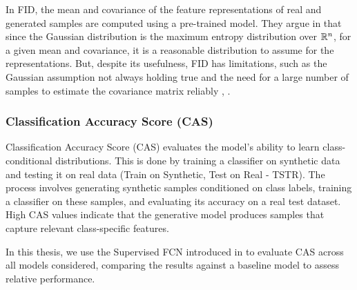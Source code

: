 \documentclass[../../thesis.tex]{subfiles}
\begin{document}
In FID, the mean and covariance of the feature representations of real and generated samples are computed using a pre-trained model. They argue in \cite{heusel2018gans} that since the Gaussian distribution is the maximum entropy distribution over $\mathbb{R}^n$, for a given mean and covariance, it is a reasonable distribution to assume for the representations. But, despite its usefulness, FID has limitations, such as the Gaussian assumption not always holding true and the need for a large number of samples to estimate the covariance matrix reliably \cite{jayasumana2024rethinking}, \cite{chong2020effectively}.

\subsubsection{Classification Accuracy Score (CAS)}
Classification Accuracy Score (CAS) evaluates the model's ability to learn class-conditional distributions. This is done by training a classifier on synthetic data and testing it on real data (Train on Synthetic, Test on Real - TSTR). The process involves generating synthetic samples conditioned on class labels, training a classifier on these samples, and evaluating its accuracy on a real test dataset. High CAS values indicate that the generative model produces samples that capture relevant class-specific features.\newline

In this thesis, we use the Supervised FCN introduced in \cite{TimeVQVAE} to evaluate CAS across all models considered, comparing the results against a baseline model to assess relative performance.
\end{document}
